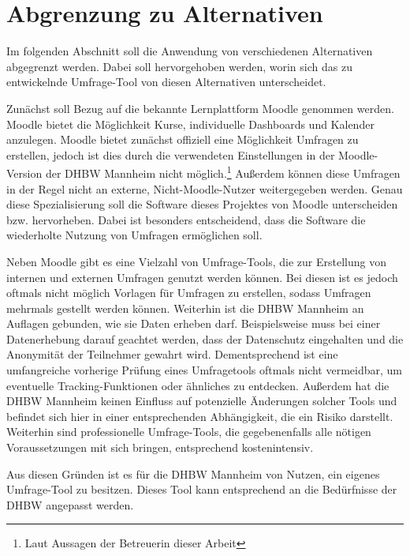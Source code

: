 \section{Abgrenzung zu Alternativen}
\label{sec:AbgrenzungZuAlternativen}

Im folgenden Abschnitt soll die Anwendung von verschiedenen Alternativen abgegrenzt werden.
Dabei soll hervorgehoben werden, worin sich das zu entwickelnde Umfrage-Tool von diesen Alternativen unterscheidet.

Zunächst soll Bezug auf die bekannte Lernplattform Moodle genommen werden.
Moodle bietet die Möglichkeit Kurse, individuelle Dashboards und Kalender anzulegen.\autocite[Vgl.][]{ms-moodle-features}
Moodle bietet zunächst offiziell eine Möglichkeit Umfragen zu erstellen, jedoch ist dies durch die verwendeten Einstellungen in der Moodle-Version der \acs{DHBW} Mannheim nicht möglich.\footnote{Laut Aussagen der Betreuerin dieser Arbeit}
Außerdem können diese Umfragen in der Regel nicht an externe, Nicht-Moodle-Nutzer weitergegeben werden.
Genau diese Spezialisierung soll die Software dieses Projektes von Moodle unterscheiden bzw. hervorheben.
Dabei ist besonders entscheidend, dass die Software die wiederholte Nutzung von Umfragen ermöglichen soll.

Neben Moodle gibt es eine Vielzahl von Umfrage-Tools, die zur Erstellung von internen und externen Umfragen genutzt werden können.
Bei diesen ist es jedoch oftmals nicht möglich Vorlagen für Umfragen zu erstellen, sodass Umfragen mehrmals gestellt werden können.
Weiterhin ist die \acs{DHBW} Mannheim an Auflagen gebunden, wie sie Daten erheben darf.
Beispielsweise muss bei einer Datenerhebung darauf geachtet werden, dass der Datenschutz eingehalten und die Anonymität der Teilnehmer gewahrt wird.
Dementsprechend ist eine umfangreiche vorherige Prüfung eines Umfragetools oftmals nicht vermeidbar, um eventuelle Tracking-Funktionen oder ähnliches zu entdecken.
Außerdem hat die \acs{DHBW} Mannheim keinen Einfluss auf potenzielle Änderungen solcher Tools und befindet sich hier in einer entsprechenden Abhängigkeit, die ein Risiko darstellt.
Weiterhin sind professionelle Umfrage-Tools, die gegebenenfalls alle nötigen Voraussetzungen mit sich bringen, entsprechend kostenintensiv.

Aus diesen Gründen ist es für die \acs{DHBW} Mannheim von Nutzen, ein eigenes Umfrage-Tool zu besitzen.
Dieses Tool kann entsprechend an die Bedürfnisse der \acs{DHBW} angepasst werden.

